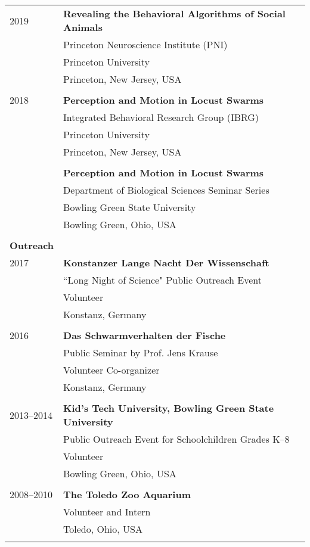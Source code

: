 \documentclass[letterpaper,7pt,oneside]{article}
\begin{document}
\begin{small}
\begin{longtable}{@{} l p{5.3in}l}
 \large{2019}
 & \textbf{Revealing the Behavioral Algorithms of Social Animals} \\
 & Princeton Neuroscience Institute (PNI) \\
 & Princeton University \\
 & Princeton, New Jersey, USA \\
 & \\
\large{2018}
& \textbf{Perception and Motion in Locust Swarms} \\
& Integrated Behavioral Research Group (IBRG) \\
& Princeton University \\
& Princeton, New Jersey, USA \\
& \\
& \textbf{Perception and Motion in Locust Swarms} \\
& Department of Biological Sciences Seminar Series \\
& Bowling Green State University \\
& Bowling Green, Ohio, USA \\
& \\
 \Large{\textbf{Outreach}}  \vspace{5mm} \\
\large{2017}
& \textbf{Konstanzer Lange Nacht Der Wissenschaft} \\
& ``Long Night of Science" Public Outreach Event \\
& Volunteer \\
& Konstanz, Germany \\
& \\
\large{2016}
& \textbf{Das Schwarmverhalten der Fische} \\
& Public Seminar by Prof. Jens Krause \\
& Volunteer Co-organizer \\
& Konstanz, Germany \\
& \\
\large{2013–2014}
& \textbf{Kid's Tech University, Bowling Green State University} \\
& Public Outreach Event for Schoolchildren Grades K–8 \\
& Volunteer \\
& Bowling Green, Ohio, USA \\
& \\
\large{2008–2010}
& \textbf{The Toledo Zoo Aquarium} \\
& Volunteer and Intern \\
& Toledo, Ohio, USA \\
& \\


\end{longtable}
\end{small}
\end{document}
